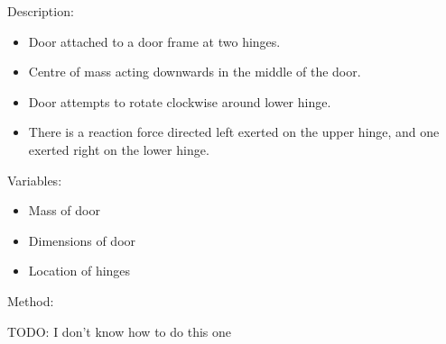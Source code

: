 \documentclass[a4paper,11pt]{article}
\begin{document}
Description:

\begin{itemize}
\item Door attached to a door frame at two hinges.
\item Centre of mass acting downwards in the middle of the door.
\item Door attempts to rotate clockwise around lower hinge.
\item There is a reaction force directed left exerted on the upper hinge, and
	one exerted right on the lower hinge.
\end{itemize}

Variables:

\begin{itemize}
\item Mass of door
\item Dimensions of door
\item Location of hinges
\end{itemize}

Method:

TODO: I don't know how to do this one
\end{document}
